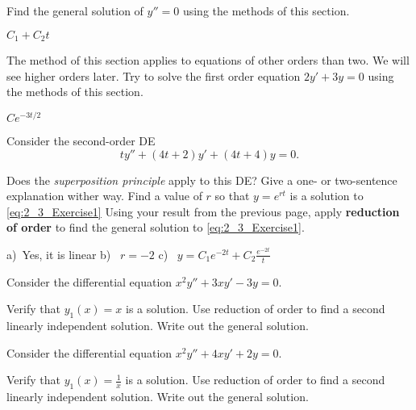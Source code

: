 \begin{exercise}
Find the general solution of $y'' = 0$ using the methods of this section.
\end{exercise}
\comboSol{%
}
{%
$C_1 + C_2t$
}

\begin{exercise}
The method of this section applies to equations of other orders than two.
We will see
higher orders later.  Try to solve the first order equation
$2y' + 3y = 0$ using the methods of this section.
\end{exercise}
\comboSol{%
}
{%
$Ce^{-3t/2}$
}

\begin{exercise}
Consider the second-order DE 
\begin{equation}
ty''+(4t+2)y'+(4t+4)y=0. \label{eq:2_3_Exercise1}
\end{equation}
\begin{tasks}
\task Does the {\it superposition principle} apply to this DE? Give a one- or two-sentence explanation wither way.
\task Find a value of $r$ so that $y=e^{rt}$ is a solution to \eqref{eq:2_3_Exercise1}
\task Using your result from the previous page, apply {\bf reduction of order} to find the general solution to \eqref{eq:2_3_Exercise1}.
\end{tasks}
\end{exercise}
\comboSol{%
}
{%
a)~Yes, it is linear \quad b)~ $r=-2$ \quad c)~ $y = C_1e^{-2t} + C_2\frac{e^{-2t}}{t}$
}

\begin{exercise}\ansMark%
Consider the differential equation $x^2y'' + 3xy' - 3y = 0$.
\begin{tasks}
\task Verify that $y_1(x) = x$ is a solution.
\task Use reduction of order to find a second linearly independent solution.
\task Write out the general solution. 
\end{tasks}
\end{exercise}

\begin{exercise}\ansMark%
Consider the differential equation $x^2y'' + 4xy' + 2y = 0$.
\begin{tasks}
\task Verify that $y_1(x) = \frac{1}{x}$ is a solution.
\task Use reduction of order to find a second linearly independent solution.
\task Write out the general solution. 
\end{tasks}
\end{exercise}


